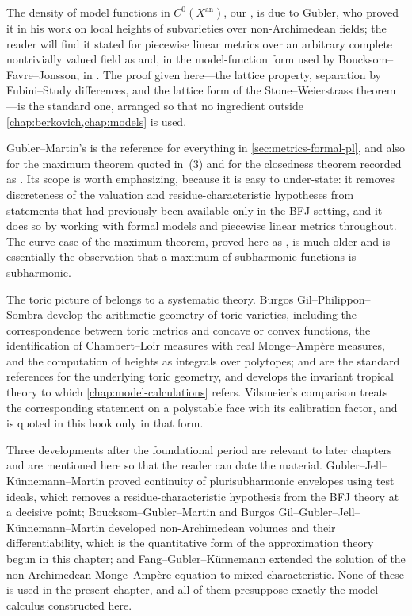 The density of model functions in $C^0(X^{\mathrm{an}})$, our
, is due to Gubler, who proved it
in his work on local heights of subvarieties over non-Archimedean fields;
the reader will find it stated for piecewise linear metrics over an
arbitrary complete nontrivially valued field as
\cite[Theorem~2.17]{GM19} and, in the model-function form used by
Boucksom--Favre--Jonsson, in \cite[\S2]{BFJ16}. The proof given here---the
lattice property, separation by Fubini--Study differences, and the lattice
form of the Stone--Weierstrass theorem---is the standard one, arranged so
that no ingredient outside \cref{chap:berkovich,chap:models} is used.

Gubler--Martin's \cite{GM19} is the reference for everything in
\cref{sec:metrics-formal-pl}, and also for the maximum theorem
\cite[Proposition~3.12]{GM19} quoted in
\,(3) and for the closedness theorem
\cite[Theorem~1.3 and Theorem~5.5]{GM19} recorded as
. Its scope is worth emphasizing,
because it is easy to under-state: it removes discreteness of the valuation
and residue-characteristic hypotheses from statements that had previously
been available only in the BFJ setting, and it does so by working with
formal models and piecewise linear metrics throughout. The curve case of the
maximum theorem, proved here as , is much older
and is essentially the observation that a maximum of subharmonic functions
is subharmonic.

The toric picture of  belongs to a
systematic theory. Burgos Gil--Philippon--Sombra \cite{BGPS14} develop the
arithmetic geometry of toric varieties, including the correspondence between
toric metrics and concave or convex functions, the identification of
Chambert--Loir measures with real Monge--Ampère measures, and the
computation of heights as integrals over polytopes; \cite{CLS11} and
\cite{Fultor} are the standard references for the underlying toric geometry,
and \cite{BGJKK25} develops the invariant tropical theory to which
\cref{chap:model-calculations} refers. Vilsmeier's comparison
\cite{Vil20} treats the corresponding statement on a polystable face with
its calibration factor, and is quoted in this book only in that form.

Three developments after the foundational period are relevant to later
chapters and are mentioned here so that the reader can date the material.
Gubler--Jell--Künnemann--Martin \cite{GJKM19} proved continuity of
plurisubharmonic envelopes using test ideals, which removes a
residue-characteristic hypothesis from the BFJ theory at a decisive point;
Boucksom--Gubler--Martin \cite{BGM21} and
Burgos Gil--Gubler--Jell--Künnemann--Martin \cite{BGGJKM20} developed
non-Archimedean volumes and their differentiability, which is the
quantitative form of the approximation theory begun in this chapter; and
Fang--Gubler--Künnemann \cite{FGK25} extended the solution of the
non-Archimedean Monge--Ampère equation to mixed characteristic. None of
these is used in the present chapter, and all of them presuppose exactly the
model calculus constructed here.

